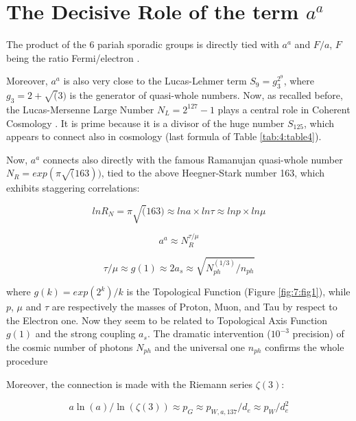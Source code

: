 \documentclass[a4paper,9pt]{article}
\begin{document}
\section{The Decisive Role of the term $a^a$ }

The product of the 6 pariah sporadic groups is directly tied with $a^a$ and $F/a$, $F$ being the ratio Fermi/electron \cite{Sanchez}. 

Moreover, $a^a$  is also very close to the Lucas-Lehmer term $S_9 = g_3^{2^9}$, where $ g_3 = 2 + \sqrt(3)$ is the generator of quasi-whole numbers. Now, as recalled before, the Lucas-Mersenne Large Number $N_L = 2^{127} - 1$ plays a central role in Coherent Cosmology \cite{Sanchez}. It is prime because it is a divisor of the huge number $S_{125}$, which appears to connect also in cosmology (last formula of Table \ref{tab:4:table4}).


Now, $a^a$ connects also directly with the famous Ramanujan quasi-whole number $N_R = exp(\pi \sqrt(163))$, tied to the above Heegner-Stark number 163, which exhibits staggering correlations:



\begin{equation}
lnR_N = \pi \sqrt(163)  \approx lna \times ln\tau  \approx  lnp \times ln\mu
\end{equation}

\begin{equation}
a^a \approx N_R^{\tau/\mu} 
\end{equation}

\begin{equation}
\tau/\mu   \approx g(1) \approx  2a_s \approx \sqrt {N_{ph}^(1/3)/n_{ph}}
\end{equation}

where $g(k) = exp(2^k)/k$ is the Topological Function (Figure \ref{fig:7:fig1}), while $p$, $\mu$ and $\tau$ are respectively the masses of Proton, Muon, and Tau by respect to the Electron one.  Now they seem to be related to Topological Axis Function $g(1)$ and the strong coupling $a_s$. The dramatic intervention ($10^{-3}$ precision) of the cosmic number of photons $N_{ph}$ and the universal one $n_{ph}$ confirms the whole procedure


Moreover, the connection is made with the Riemann series $\zeta(3)$:

\begin{equation}
a\ln(a)/\ln(\zeta(3)) \approx p_G \approx p_{W,a,137}/d_e \approx p_W/d_e^2
\end{equation}
\end{document}
